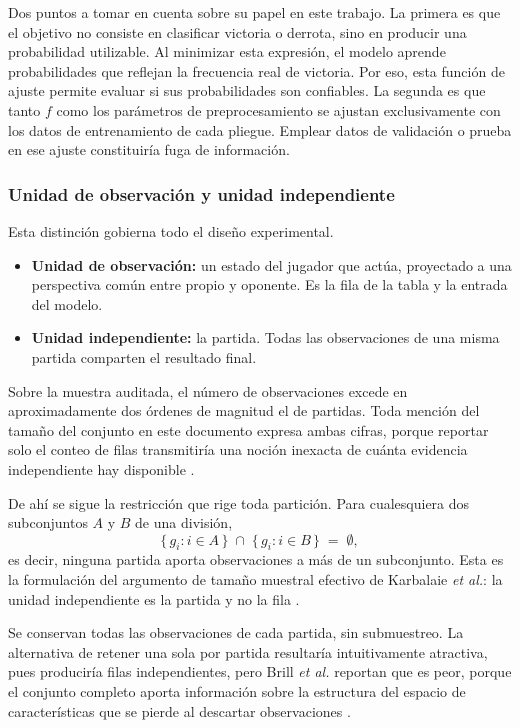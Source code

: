 Dos puntos a tomar en cuenta sobre su papel en este trabajo. La primera es que el objetivo
no consiste en clasificar victoria o derrota, sino en producir una
probabilidad utilizable. Al minimizar esta expresión, el modelo aprende
probabilidades que reflejan la frecuencia real de victoria. Por eso, esta
función de ajuste permite evaluar si sus probabilidades son confiables. La
segunda es que tanto $f$ como los
parámetros de preprocesamiento se ajustan exclusivamente con los datos de
entrenamiento de cada pliegue. Emplear datos de validación o prueba en ese
ajuste constituiría fuga de información.

\subsubsection{Unidad de observación y unidad independiente}

Esta distinción gobierna todo el diseño experimental.

\begin{itemize}
  \item \textbf{Unidad de observación:} un estado del jugador que actúa,
        proyectado a una perspectiva común entre propio y oponente. Es la
        fila de la tabla y la entrada del modelo.
  \item \textbf{Unidad independiente:} la partida. Todas las observaciones
        de una misma partida comparten el resultado final.
\end{itemize}

Sobre la muestra auditada, el número de observaciones excede en
aproximadamente dos órdenes de magnitud el de partidas. Toda mención del
tamaño del conjunto en este documento expresa ambas cifras, porque reportar
solo el conteo de filas transmitiría una noción inexacta de cuánta evidencia
independiente hay disponible \cite{brill_winprob_2026}.

De ahí se sigue la restricción que rige toda partición. Para cualesquiera
dos subconjuntos $A$ y $B$ de una división,
\begin{equation}
\label{eq:agrupacion}
  \{\, g_i : i \in A \,\} \;\cap\; \{\, g_i : i \in B \,\} \;=\; \emptyset ,
\end{equation}
es decir, ninguna partida aporta observaciones a más de un subconjunto. Esta
es la formulación del argumento de tamaño muestral efectivo de Karbalaie
\textit{et al.}: la unidad independiente es la partida y no la fila
\cite{karbalaie_participantaware_2026}.

Se conservan todas las observaciones de cada partida, sin submuestreo. La
alternativa de retener una sola por partida resultaría intuitivamente
atractiva, pues produciría filas independientes, pero Brill \textit{et al.}
reportan que es peor, porque el conjunto completo aporta información sobre la
estructura del espacio de características que se pierde al descartar
observaciones \cite{brill_winprob_2026}.

